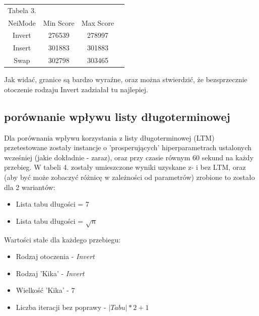 \documentclass{article}
\begin{document}
\begin{table}[h!]
	\centering
	\begin{tabular}{c||c|c|c}
	Tabela 3.\\
NeiMode & Min Score & Max Score \\
\hline
Invert & 276539 & 278997 \\
Insert & 301883 & 301883 \\
Swap & 302798 & 303465 \\
\end{tabular}
\end{table}

Jak widać, granice są bardzo wyraźne, oraz można stwierdzić, że bezsprzecznie otoczenie rodzaju Invert zadziałał tu najlepiej.

\newpage
\subsection{porównanie wpływu listy długoterminowej}

Dla porównania wpływu korzystania z listy długoterminowej (LTM) przetestowane zostały instancje o 'prosperujących' hiperparametrach ustalonych wcześniej (jakie dokładnie - zaraz), oraz przy czasie równym 60 sekund na każdy przebieg. W tabeli 4. zostały umieszczone wyniki uzyskane z- i bez LTM, oraz (aby być może zobaczyć różnicę w zależności od parametrów) zrobione to zostało dla 2 wariantów:
\begin{itemize}
	\item Lista tabu długości = 7
	\item Lista tabu długości = $\sqrt{n}$
\end{itemize}
Wartości stałe dla każdego przebiegu:
\begin{itemize}
	\item Rodzaj otoczenia - \textit{Invert}
	\item Rodzaj 'Kika' - \textit{Invert}
	\item Wielkość 'Kika' - 7
	\item Liczba iteracji bez poprawy - $|Tabu|*2 + 1$
\end{itemize}
\end{document}
